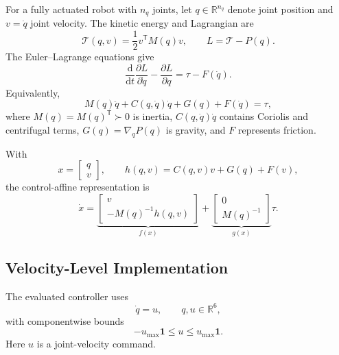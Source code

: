 \documentclass[conference]{IEEEtran}
\newcommand{\R}{\mathbb{R}}
\newcommand{\trans}{^{\mathsf T}}
\begin{document}
For a fully actuated robot with $n_q$ joints,
let $q\in\R^{n_q}$ denote joint position and
$v=\dot q$ joint velocity.
The kinetic energy and Lagrangian are
\begin{equation}
    \mathcal T(q,v)=\frac12v\trans M(q)v,
    \qquad L=\mathcal T-P(q).
\end{equation}
The Euler--Lagrange equations give
\begin{equation}
    \frac{\mathrm d}{\mathrm dt}
    \frac{\partial L}{\partial\dot q}
    -
    \frac{\partial L}{\partial q}
    =
    \tau-F(\dot q).
\end{equation}
Equivalently,
\begin{equation}
    M(q)\ddot q+C(q,\dot q)\dot q
    +G(q)+F(\dot q)=\tau,
    \label{eq:el}
\end{equation}
where $M(q)=M(q)\trans\succ0$ is inertia,
$C(q,\dot q)\dot q$ contains Coriolis and centrifugal
terms, $G(q)=\nabla_qP(q)$ is gravity, and $F$
represents friction.

With
\begin{equation}
    x=\begin{bmatrix}q\\v\end{bmatrix},
    \qquad h(q,v)=C(q,v)v+G(q)+F(v),
\end{equation}
the control-affine representation is
\begin{equation}
    \dot x=
    \underbrace{
    \begin{bmatrix}
        v\\-M(q)^{-1}h(q,v)
    \end{bmatrix}}_{f(x)}
    +
    \underbrace{
    \begin{bmatrix}
        0\\M(q)^{-1}
    \end{bmatrix}}_{g(x)}
    \tau.
    \label{eq:el-affine}
\end{equation}

\subsection{Velocity-Level Implementation}

The evaluated controller uses
\begin{equation}
    \dot q=u,\qquad q,u\in\R^6,
    \label{eq:kinematic}
\end{equation}
with componentwise bounds
\begin{equation}
    -u_{\max}\mathbf1\leq u\leq u_{\max}\mathbf1.
    \label{eq:bounds}
\end{equation}
Here $u$ is a joint-velocity command.
\end{document}
